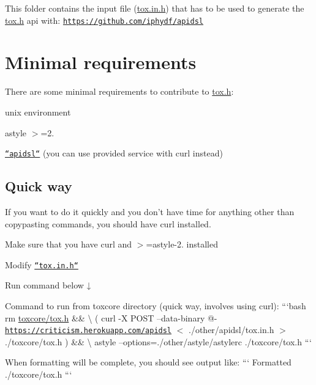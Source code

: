 This folder contains the input file ({\ttfamily \hyperlink{tox_8in_8h_source}{tox.\+in.\+h}}) that has to be used to generate the {\ttfamily \hyperlink{tox_8h_source}{tox.\+h}} api with\+: \href{https://github.com/iphydf/apidsl}{\tt https\+://github.\+com/iphydf/apidsl}

\section*{Minimal requirements}

There are some minimal requirements to contribute to {\ttfamily \hyperlink{tox_8h_source}{tox.\+h}}\+:
\begin{DoxyItemize}
\item unix environment
\item {\ttfamily astyle} {\ttfamily $>$=2.}
\item \href{https://github.com/iphydf/apidsl}{\tt ``apidsl``} (you can use provided service with curl instead)
\end{DoxyItemize}

\subsection*{Quick way}

If you want to do it quickly and you don't have time for anything other than copypasting commands, you should have {\ttfamily curl} installed.


\begin{DoxyEnumerate}
\item Make sure that you have {\ttfamily curl} and {\ttfamily $>$=astyle-\/2.} installed
\item Modify \href{/other/apidsl/tox.in.h}{\tt ``tox.in.\+h``}
\item Run command below ↓
\end{DoxyEnumerate}

Command to run from {\ttfamily toxcore} directory (quick way, involves using curl)\+: ```bash rm \hyperlink{tox_8h_source}{toxcore/tox.\+h} \&\& \textbackslash{} ( curl -\/\+X P\+O\+S\+T --data-\/binary @-\/ \href{https://criticism.herokuapp.com/apidsl}{\tt https\+://criticism.\+herokuapp.\+com/apidsl} $<$ ./other/apidsl/tox.in.\+h $>$ ./toxcore/tox.h ) \&\& \textbackslash{} astyle --options=./other/astyle/astylerc ./toxcore/tox.h ```

When formatting will be complete, you should see output like\+: ``` Formatted ./toxcore/tox.h ```

